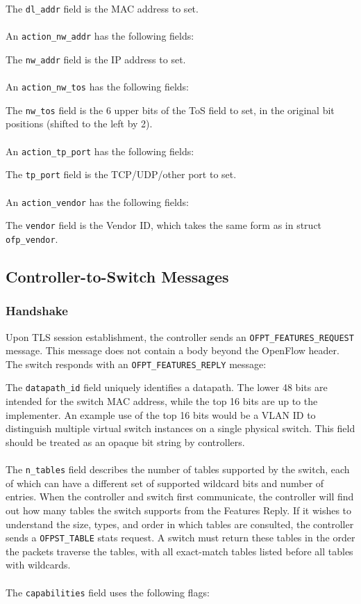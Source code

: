 
The \verb|dl_addr| field is the MAC address to set.
\\\\
An \verb|action_nw_addr| has the following fields:


The \verb|nw_addr| field is the IP address to set.
\\\\
An \verb|action_nw_tos| has the following fields:


The \verb|nw_tos| field is the 6 upper bits of the ToS field to set, in the original bit positions (shifted to the left by 2).
\\\\
An \verb|action_tp_port| has the following fields:


The \verb|tp_port| field is the TCP/UDP/other port to set.
\\\\
An \verb|action_vendor| has the following fields:


The \verb|vendor| field is the Vendor ID, which takes the same form as in struct \verb|ofp_vendor|.

\subsection{Controller-to-Switch Messages}

\subsubsection{Handshake}
\label{cts:handshake} 
Upon TLS session establishment, the controller sends an \verb|OFPT_FEATURES_REQUEST| message.  This message does not contain a body beyond the OpenFlow header.  The switch responds with an \verb|OFPT_FEATURES_REPLY| message:


The \verb|datapath_id| field uniquely identifies a datapath.  The lower 48 bits are intended for the switch MAC address, while the top 16 bits are up to the implementer.  An example use of the top 16 bits would be a VLAN ID to distinguish multiple virtual switch instances on a single physical switch.  This field should be treated as an opaque bit string by controllers.
\\\\
The \verb|n_tables| field describes the number of tables supported by the switch, each of which can have a different set of supported wildcard bits and number of entries.  When the controller and switch first communicate, the controller will find out how many tables the switch supports from the Features Reply. If it wishes to understand the size, types, and order in which tables are consulted, the controller sends a \verb|OFPST_TABLE| stats request. A switch must return these tables in the order the packets traverse the tables, with all exact-match tables listed before all tables with wildcards.
\\\\
The \verb|capabilities| field uses the following flags:

